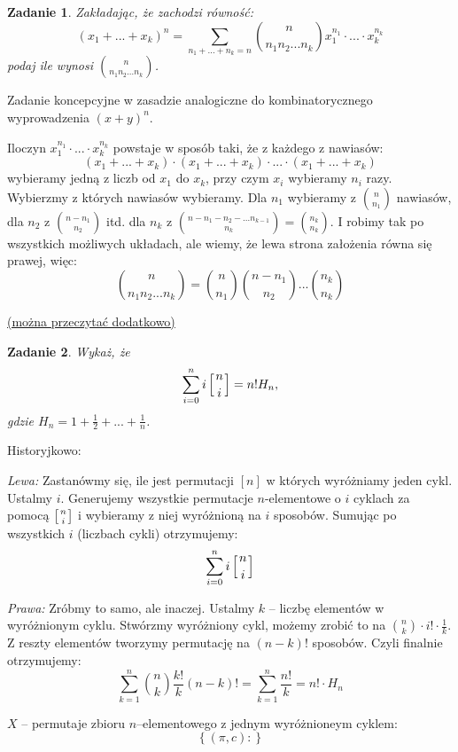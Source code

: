 \documentclass{mwbk}
\newtheorem{zad}{Zadanie}[chapter]
\begin{document}
\begin{zad}
    Zakładając, że zachodzi równość:
    \[
        (x_1 + ... + x_k)^n = \sum_{n_1+...+n_k=n}\binom{n}{n_1 n_2 ... n_k}x_1^{n_1}\cdot...\cdot x_k^{n_k}
    \]
    podaj ile wynosi $\binom{n}{n_1 n_2 ... n_k}$.
\end{zad}
\begin{mdframed}
Zadanie koncepcyjne w zasadzie analogiczne do kombinatorycznego wyprowadzenia
$(x+y)^n$.

Iloczyn $x_1^{n_1}\cdot ... \cdot x_k^{n_k}$ powstaje w sposób taki, że z każdego z nawiasów:
\[(x_1 + ... + x_k) \cdot (x_1 + ... + x_k) \cdot ... \cdot (x_1 + ... + x_k)\]
wybieramy jedną z liczb od $x_1$ do $x_k$, przy czym $x_i$ wybieramy
$n_i$ razy.
Wybierzmy z których nawiasów wybieramy. Dla $n_1$ wybieramy z $\binom{n}{n_1}$
nawiasów, dla $n_2$ z $\binom{n-n_1}{n_2}$ itd. dla $n_k$ z
$\binom{n-n_1-n_2-...n_{k-1}}{n_k} = \binom{n_k}{n_k}$.
I robimy tak po wszystkich możliwych układach, ale wiemy, że lewa
strona założenia równa się prawej, więc:
\[
    \binom{n}{n_1 n_2 ... n_k} = \binom{n}{n_1} \binom{n-n_1}{n_2} ... \binom{n_k}{n_k}
\]

\begin{center}\href{https://lidicky.name/oldteaching/20.569X/l03%20-%20Binomial%20Theorem.pdf}{(można przeczytać dodatkowo)}\end{center}
\end{mdframed}




\begin{zad}
    Wykaż, że
    \[
        \sum_{i=0}^{n} i \left[ n \atop i \right] = n! H_n,
    \]
    gdzie $H_n = 1 + \frac{1}{2} + ... + \frac{1}{n}$.
\end{zad}
\begin{mdframed}
    Historyjkowo:

    \textit{Lewa:}
    Zastanówmy się, ile jest permutacji $[n]$ w których wyróżniamy jeden cykl.
    Ustalmy $i$. Generujemy wszystkie permutacje $n$-elementowe o $i$ cyklach za pomocą
    $\left[ n \atop i \right]$ i wybieramy z niej wyróżnioną na $i$ sposobów.
    Sumując po wszystkich $i$ (liczbach cykli) otrzymujemy:
    \[\sum_{i=0}^{n} i \left[ n \atop i \right]\]

    \textit{Prawa:}
    Zróbmy to samo, ale inaczej. Ustalmy $k$ -- liczbę elementów
    w wyróżnionym cyklu. Stwórzmy wyróżniony cykl,
    możemy zrobić to na $\binom{n}{k} \cdot i! \cdot \frac{1}{k}$.
    Z reszty elementów tworzymy permutację na $(n-k)!$ sposobów.
    Czyli finalnie otrzymujemy:
    \[
        \sum_{k=1}^{n}\binom{n}{k}\frac{k!}{k}(n-k)! = \sum_{k=1}^{n}\frac{n!}{k} = n! \cdot H_n
    \]
\end{mdframed}
\begin{mdframed}
    $X$ -- permutaje zbioru $n$--elementowego z jednym wyróżnioneym cyklem:
    \[\left\{(\pi, c):  \right\}\]

\end{mdframed}
\end{document}
